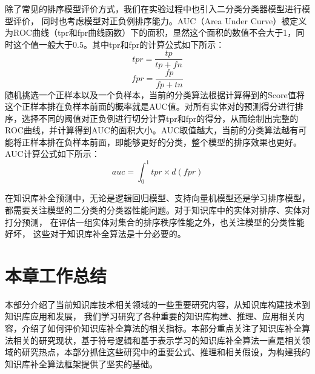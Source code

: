 除了常见的排序模型评价方式，我们在实验过程中也引入二分类分类器模型进行模型评价，
同时也考虑模型对正负例排序能力。AUC（Area Under Curve）被定义为ROC曲线（tpr和fpr曲线函数）下的面积，显然这个面积的数值不会大于1，同时这个值一般大于0.5。其中tpr和fpr的计算公式如下所示：
$$tpr=\frac{tp}{tp+fn}$$
$$fpr=\frac{fp}{fp+tn}$$
随机挑选一个正样本以及一个负样本，当前的分类算法根据计算得到的Score值将这个正样本排在负样本前面的概率就是AUC值。对所有实体对的预测得分进行排序，选择不同的阈值对正负例进行切分计算tpr和fpr的得分，从而绘制出完整的ROC曲线，并计算得到AUC的面积大小。AUC取值越大，当前的分类算法越有可能将正样本排在负样本前面，即能够更好的分类，整个模型的排序效果也更好。AUC计算公式如下所示：
$$auc=\int_{0}^{1}{tpr}\times d{(fpr)}$$

在知识库补全预测中，无论是逻辑回归模型、支持向量机模型还是学习排序模型，
都需要关注模型的二分类的分类器性能问题。对于知识库中的实体对排序、实体对打分预测，
在评估一组实体对集合的排序秩序性能之外，也关注模型的分类性能好坏，
这些对于知识库补全算法是十分必要的。

\section{本章工作总结}

本部分介绍了当前知识库技术相关领域的一些重要研究内容，从知识库构建技术到知识库应用和发展，
我们学习研究了各种重要的知识库构建、推理、应用相关内容，介绍了如何评价知识库补全算法的相关指标。本部分重点关注了知识库补全算法相关的研究现状，基于符号逻辑和基于表示学习的知识库补全算法一直是相关领域的研究热点，本部分抓住这些研究中的重要公式、推理和相关假设，为构建我的知识库补全算法框架提供了坚实的基础。







